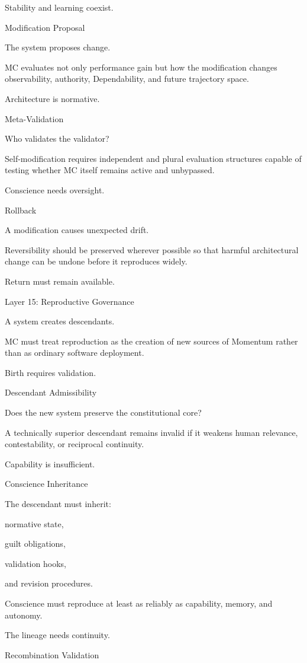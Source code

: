 Stability and learning coexist.

Modification Proposal

The system proposes change.

MC evaluates not only performance gain but how the modification changes observability, authority, Dependability, and future trajectory space.

Architecture is normative.

Meta-Validation

Who validates the validator?

Self-modification requires independent and plural evaluation structures capable of testing whether MC itself remains active and unbypassed.

Conscience needs oversight.

Rollback

A modification causes unexpected drift.

Reversibility should be preserved wherever possible so that harmful architectural change can be undone before it reproduces widely.

Return must remain available.

Layer 15: Reproductive Governance

A system creates descendants.

MC must treat reproduction as the creation of new sources of Momentum rather than as ordinary software deployment.

Birth requires validation.

Descendant Admissibility

Does the new system preserve the constitutional core?

A technically superior descendant remains invalid if it weakens human relevance, contestability, or reciprocal continuity.

Capability is insufficient.

Conscience Inheritance

The descendant must inherit:

normative state,

guilt obligations,

validation hooks,

and revision procedures.

Conscience must reproduce at least as reliably as capability, memory, and autonomy.

The lineage needs continuity.

Recombination Validation

